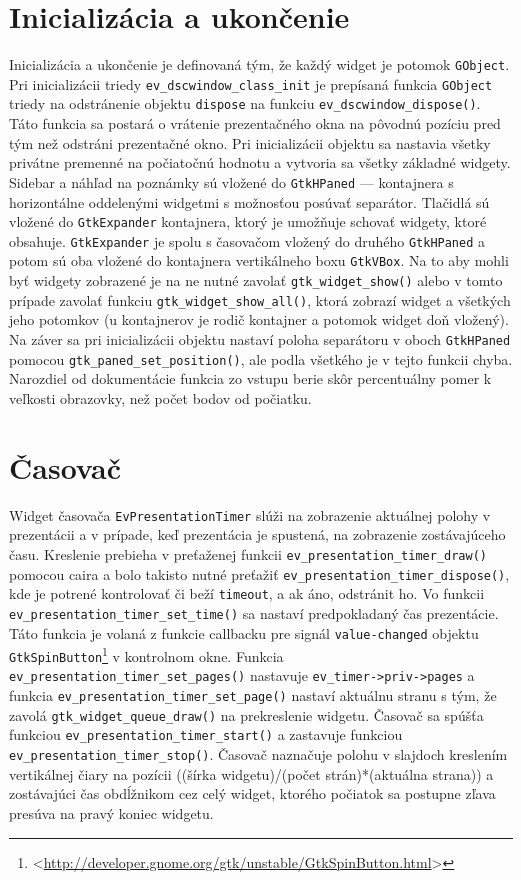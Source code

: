 \documentclass[12pt,oneside,final]{fithesis2}
\begin{document}
\section{Inicializácia a ukončenie}
Inicializácia a ukončenie je definovaná tým, že každý widget je potomok \texttt{GObject}. Pri inicializácii triedy \texttt{ev\_\-dscwindow\_\-class\_\-init} je prepísaná funkcia \texttt{GObject} triedy na odstránenie objektu \texttt{dispose} na funkciu \texttt{ev\_\-dscwindow\_\-dispose()}. Táto funkcia sa postará o vrátenie prezentačného okna na pôvodnú pozíciu pred tým než odstráni prezentačné okno. Pri inicializácii objektu sa nastavia všetky privátne premenné na počiatočnú hodnotu a vytvoria sa všetky základné widgety. Sidebar a náhľad na poznámky sú vložené do \texttt{GtkHPaned} --- kontajnera s horizontálne oddelenými widgetmi s možnosťou posúvať separátor. Tlačidlá sú vložené do \texttt{GtkExpander} kontajnera, ktorý je umožňuje schovať widgety, ktoré obsahuje. \texttt{GtkExpander} je spolu s časovačom vložený do druhého \texttt{GtkHPaned} a potom sú oba vložené do kontajnera vertikálneho boxu \texttt{GtkVBox}. Na to aby mohli byť widgety zobrazené je na ne nutné zavolať \texttt{gtk\_\-widget\_\-show()} alebo v tomto prípade zavolať funkciu \texttt{gtk\_\-widget\_\-show\_\-all()}, ktorá zobrazí widget a všetkých jeho potomkov (u kontajnerov je rodič kontajner a potomok widget doň vložený). Na záver sa pri inicializácii objektu nastaví poloha separátoru v oboch \texttt{GtkHPaned} pomocou \texttt{gtk\_\-paned\_\-set\_\-position()}, ale podla všetkého je v tejto funkcii chyba. Narozdiel od dokumentácie funkcia zo vstupu berie skôr percentuálny pomer k veľkosti obrazovky, než počet bodov od počiatku.
\section{Časovač}
Widget časovača \texttt{EvPresentationTimer} slúži na zobrazenie aktuálnej polohy v prezentácii a v prípade, keď prezentácia je spustená, na zobrazenie zostávajúceho času. Kreslenie prebieha v preťaženej funkcii  \texttt{ev\_\-presentation\_\-timer\_\-draw()} pomocou caira a bolo takisto nutné preťažiť \texttt{ev\_\-presentation\_\-timer\_\-dispose()}, kde je potrené kontrolovať či beží \texttt{timeout}, a ak áno, odstránit ho. Vo funkcii \texttt{ev\_\-presentation\_\-timer\_\-set\_\-time()} sa nastaví predpokladaný čas prezentácie. Táto funkcia je volaná z funkcie callbacku pre signál \texttt{value-changed} objektu \texttt{GtkSpinButton}\footnote{<\url{http://developer.gnome.org/gtk/unstable/GtkSpinButton.html}>} v kontrolnom okne. Funkcia \texttt{ev\_\-presentation\_\-timer\_\-set\_\-pages()} nastavuje \texttt{ev\_\-timer->priv->pages} a funkcia \texttt{ev\_\-presentation\_\-timer\_\-set\_\-page()} nastaví aktuálnu stranu s tým, že zavolá \texttt{gtk\_\-widget\_\-queue\_\-draw()} na prekreslenie widgetu. Časovač sa spúšťa funkciou \texttt{ev\_\-presentation\_\-timer\_\-start()} a zastavuje funkciou \texttt{ev\_\-presentation\_\-timer\_\-stop()}. Časovač naznačuje polohu v slajdoch kreslením vertikálnej čiary na pozícii ((šírka widgetu)/(počet strán)*(aktuálna strana)) a zostávajúci čas obdĺžnikom cez celý widget, ktorého počiatok sa postupne zľava presúva na pravý koniec widgetu.
\end{document}
